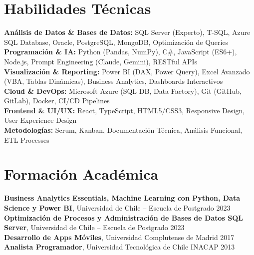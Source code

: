 \documentclass[11pt,letterpaper]{article}
\begin{document}
\section{Habilidades T\'{e}cnicas}
\textbf{Análisis de Datos \& Bases de Datos:} SQL Server (Experto), T-SQL, Azure SQL Database, Oracle, PostgreSQL, MongoDB, Optimización de Queries \\
\textbf{Programación \& IA:} Python (Pandas, NumPy), C\#, JavaScript (ES6+), Node.js, Prompt Engineering (Claude, Gemini), RESTful APIs \\
\textbf{Visualización \& Reporting:} Power BI (DAX, Power Query), Excel Avanzado (VBA, Tablas Dinámicas), Business Analytics, Dashboards Interactivos \\
\textbf{Cloud \& DevOps:} Microsoft Azure (SQL DB, Data Factory), Git (GitHub, GitLab), Docker, CI/CD Pipelines \\
\textbf{Frontend \& UI/UX:} React, TypeScript, HTML5/CSS3, Responsive Design, User Experience Design \\
\textbf{Metodologías:} Scrum, Kanban, Documentación Técnica, Análisis Funcional, ETL Processes

\section{Formaci\'{o}n Acad\'{e}mica}
\textbf{Business Analytics Essentials, Machine Learning con Python, Data Science y Power BI}, Universidad de Chile – Escuela de Postgrado \hfill 2023 \\
\textbf{Optimización de Procesos y Administración de Bases de Datos SQL Server}, Universidad de Chile – Escuela de Postgrado \hfill 2023 \\
\textbf{Desarrollo de Apps Móviles}, Universidad Complutense de Madrid \hfill 2017 \\
\textbf{Analista Programador}, Universidad Tecnológica de Chile INACAP \hfill 2013
\end{document}
